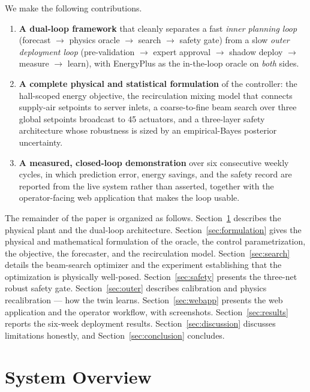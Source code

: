 \documentclass[11pt]{article}
\begin{document}
We make the following contributions.
\begin{enumerate}[leftmargin=1.4em,itemsep=2pt,topsep=2pt]
  \item \textbf{A dual-loop framework} that cleanly separates a fast \emph{inner planning
  loop} (forecast \(\rightarrow\) physics oracle \(\rightarrow\) search \(\rightarrow\)
  safety gate) from a slow \emph{outer deployment loop} (pre-validation \(\rightarrow\)
  expert approval \(\rightarrow\) shadow deploy \(\rightarrow\) measure \(\rightarrow\)
  learn), with EnergyPlus as the in-the-loop oracle on \emph{both} sides.
  \item \textbf{A complete physical and statistical formulation} of the controller: the
  hall-scoped energy objective, the recirculation mixing model that connects supply-air
  setpoints to server inlets, a coarse-to-fine beam search over three global setpoints
  broadcast to 45 actuators, and a three-layer safety architecture whose robustness is
  sized by an empirical-Bayes posterior uncertainty.
  \item \textbf{A measured, closed-loop demonstration} over six consecutive weekly
  cycles, in which prediction error, energy savings, and the safety record are reported
  from the live system rather than asserted, together with the operator-facing web
  application that makes the loop usable.
\end{enumerate}

The remainder of the paper is organized as follows.
Section~\ref{sec:overview} describes the physical plant and the dual-loop architecture.
Section~\ref{sec:formulation} gives the physical and mathematical formulation of the
oracle, the control parametrization, the objective, the forecaster, and the
recirculation model. Section~\ref{sec:search} details the beam-search optimizer and
the experiment establishing that the optimization is physically well-posed.
Section~\ref{sec:safety} presents the three-net robust safety gate.
Section~\ref{sec:outer} describes calibration and physics recalibration --- how the twin
learns. Section~\ref{sec:webapp} presents the web application and the operator workflow,
with screenshots. Section~\ref{sec:results} reports the six-week deployment results.
Section~\ref{sec:discussion} discusses limitations honestly, and
Section~\ref{sec:conclusion} concludes.

\section{System Overview}
\label{sec:overview}
\end{document}

